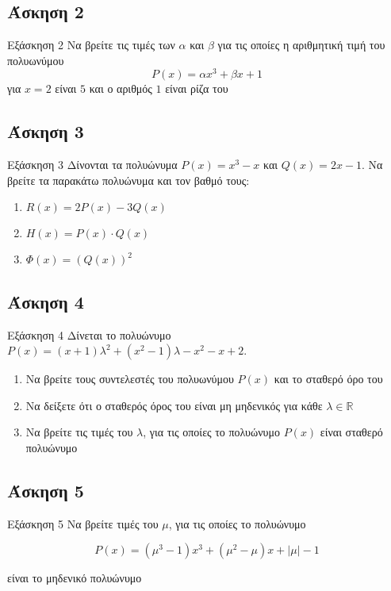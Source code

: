 \documentclass[greek]{beamer}
\begin{document}
\subsection{Άσκηση 2}
\begin{frame}[label=Άσκηση2]{Εξάσκηση 2}
 Να βρείτε τις τιμές των $α$ και $β$ για τις οποίες η αριθμητική τιμή του πολυωνύμου
 $$P(x)=αx^3+βx+1$$
 για $x=2$ είναι $5$ και ο αριθμός $1$ είναι ρίζα του

\end{frame}

\subsection{Άσκηση 3}
\begin{frame}[label=Άσκηση3]{Εξάσκηση 3}
 Δίνονται τα πολυώνυμα $P(x)=x^3-x$ και $Q(x)=2x-1$. Να βρείτε τα παρακάτω πολυώνυμα και τον βαθμό τους:
 \begin{enumerate}
  \item<1-> $R(x)=2P(x)-3Q(x)$
  \item<2-> $H(x)=P(x)\cdot Q(x)$
  \item<3-> $Φ(x)=\left( Q(x) \right)^2 $
 \end{enumerate}

\end{frame}

\subsection{Άσκηση 4}
\begin{frame}[label=Άσκηση4]{Εξάσκηση 4}
 Δίνεται το πολυώνυμο $P(x)=(x+1)λ^2+(x^2-1)λ-x^2-x+2$.
 \begin{enumerate}
  \item<1-> Να βρείτε τους συντελεστές του πολυωνύμου $P(x)$ και το σταθερό όρο του
  \item<2-> Να δείξετε ότι ο σταθερός όρος του είναι μη μηδενικός για κάθε $λ\in\mathbb{R}$
  \item<3-> Να βρείτε τις τιμές του $λ$, για τις οποίες το πολυώνυμο $P(x)$ είναι σταθερό πολυώνυμο
 \end{enumerate}

\end{frame}

\subsection{Άσκηση 5}
\begin{frame}[label=Άσκηση5]{Εξάσκηση 5}
 Να βρείτε τιμές του $μ$, για τις οποίες το πολυώνυμο

 $$P(x)=(μ^3-1)x^3+(μ^2-μ)x+|μ|-1$$

 είναι το μηδενικό πολυώνυμο

\end{frame}
\end{document}
